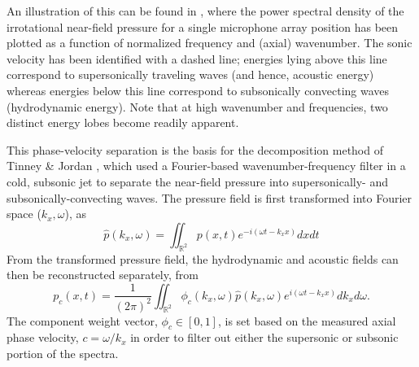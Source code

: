 An illustration of this can be found in , where the power spectral density of the irrotational near-field pressure for a single microphone array position has been plotted as a function of normalized frequency and (axial) wavenumber.
The sonic velocity has been identified with a dashed line; energies lying above this line correspond to supersonically traveling waves (and hence, acoustic energy) whereas energies below this line correspond to subsonically convecting waves (hydrodynamic energy).
Note that at high wavenumber and frequencies, two distinct energy lobes become readily apparent.

This phase-velocity separation is the basis for the decomposition method of Tinney \& Jordan \citep{Tinney2008}, which used a Fourier-based wavenumber-frequency filter in a cold, subsonic jet to separate the near-field pressure into supersonically- and subsonically-convecting waves.
The pressure field is first transformed into Fourier space ($k_x,\omega$), as
\begin{equation}
	\hat{p} \left( k_x , \omega \right) = \iint_{\mathbb{R}^2} p(x,t)e^{-i(\omega t - k_x x)}dxdt
\end{equation}
From the transformed pressure field, the hydrodynamic and acoustic fields can then be reconstructed separately, from
\begin{equation}
	p_c (x,t) = \frac{1}{(2 \pi)^2} \iint_{\mathbb{R}^2} \phi_c (k_x,\omega) \hat{p} (k_x,\omega)e^{i(\omega t - k_x x)}dk_x d\omega .
	\label{eq:fourier_filter}
\end{equation}
The component weight vector, $\phi_c \in [0,1]$, is set based on the measured axial phase velocity, $c = \omega / k_x$ in order to filter out either the supersonic or subsonic portion of the spectra. 
 

